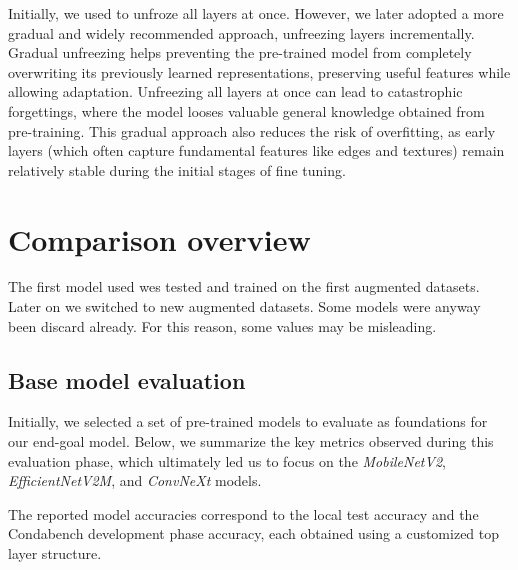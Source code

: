 \documentclass[11pt]{article}
\begin{document}
Initially, we used to unfroze all layers at once. 
However, we later adopted a more gradual and widely recommended approach, unfreezing layers incrementally. 
Gradual unfreezing helps preventing the pre-trained model from completely overwriting its previously learned representations, preserving useful features while allowing adaptation. Unfreezing all layers at once can lead to catastrophic forgettings, where the model looses valuable general knowledge obtained from pre-training.
This gradual approach also reduces the risk of overfitting, as early layers (which often capture fundamental features like edges and textures) remain relatively stable during the initial stages of fine tuning.

\section{Comparison overview}

The first model used wes tested and trained on the first augmented datasets.
Later on we switched to new augmented datasets. 
Some models were anyway been discard already. 
For this reason, some values may be misleading.

\subsection{Base model evaluation}

Initially, we selected a set of pre-trained models to evaluate as foundations for our end-goal model.
Below, we summarize the key metrics observed during this evaluation phase, which ultimately led us to focus on the \textit{MobileNetV2}, \textit{EfficientNetV2M}, and \textit{ConvNeXt} models.

The reported model accuracies correspond to the local test accuracy and the Condabench development phase accuracy, each obtained using a customized top layer structure.  
\end{document}
